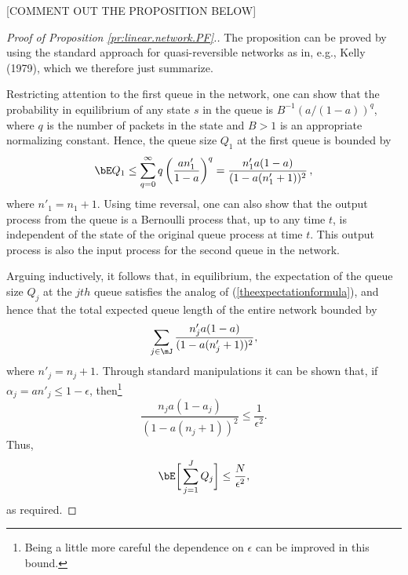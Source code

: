 \documentclass{amsart}
\begin{document}
[COMMENT OUT THE PROPOSITION BELOW]
\begin{proof}[Proof of Proposition \ref{pr:linear.network.PF}.]
The proposition can be proved by using the standard approach for quasi-reversible
networks as in, e.g., Kelly (1979), which we therefore just summarize. 

Restricting attention to the first queue in the network, one can
show that the probability in equilibrium of any state $s$ in the queue is
$B^{-1}( a/(1-a))^q$,
where $q$ is the number of packets in the state and $B > 1$ is an appropriate normalizing constant.
Hence, the queue size $Q_1$ at the first queue is bounded by 
\begin{equation}
\label{theexpectationformula}
\bE Q_1 \leq \sum_{q=0}^\infty q \left( \frac{an'_1}{1-a} \right)^{q} = \frac{n'_1 a (1-a)}{(1 -a(n'_1+1))^2}\,,
\end{equation}
where $n'_1 = n_1 +1$.  Using time reversal, one can also show that the output process from the queue is a 
Bernoulli process that, up to any time $t$, is independent of the state of the original queue process at time $t$.  This output process is also the input process for the second queue in the network.

Arguing inductively, it follows that, in equilibrium, the expectation of the queue size
$Q_j$ at the $jth$ queue satisfies the analog of (\ref{theexpectationformula}), and
hence that
the total expected queue length of the entire network bounded by
\begin{equation*}
\sum_{j\in\mJ}  \frac{n'_j a (1-a)}{(1 -a(n'_j+1))^2},
\end{equation*}
where $n'_j = n_j +1$.
Through standard manipulations it can be shown that, if $\alpha_j= an'_j \le 1- \epsilon$, then\footnote{Being a little more careful the dependence on $\epsilon$ can be improved in this bound.}
\begin{equation*}
\frac{n_ja (1-a_j)}{(1 -a(n_j+1))^2} \leq \frac{1}{\epsilon^2}.
\end{equation*}
Thus,
\begin{equation*}
\bE \bigg[ \sum_{j=1}^J Q_j \bigg]  \leq \frac{N}{\epsilon^2},
\end{equation*}
as required.
\end{proof}
\fi

\iffalse
\end{document}
